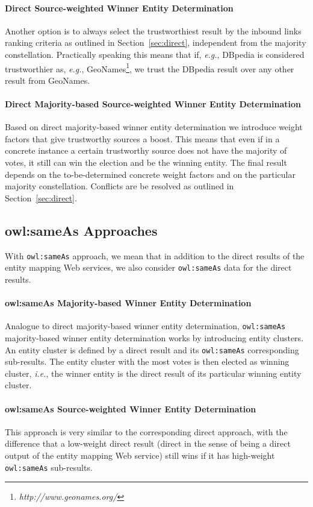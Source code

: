 \documentclass[twocolumn]{article}
\begin{document}
\paragraph{Direct Source-weighted Winner Entity Determination}
Another option is to always select the trustworthiest result by the inbound links ranking criteria as outlined in Section~\ref{sec:direct}, independent from the majority constellation. Practically speaking this means that
if, \emph{e.g.}, DBpedia is considered trustworthier as, \emph{e.g.},  GeoNames\footnote{\textit{http://www.geonames.org/}}, we
trust the DBpedia result over any other result from GeoNames.

\paragraph{Direct Majority-based Source-weighted Winner Entity Determination}
Based on direct majority-based winner entity determination we introduce weight factors that give trustworthy
sources a boost. This means that even if in a concrete instance a certain trustworthy source does not have the majority of votes, it still
can win the election and be the winning entity. The final result depends on the to-be-determined concrete
weight factors and on the particular majority constellation. Conflicts are be resolved as outlined in Section~\ref{sec:direct}.

\subsection{owl:sameAs Approaches}
With \texttt{owl:sameAs} approach, we mean that in addition to the direct results of the entity mapping Web services, we also
consider \texttt{owl:sameAs} data for the direct results.

\paragraph{owl:sameAs Majority-based Winner Entity Determination}\label{sec:owlsameas}
Analogue to direct majority-based winner entity determination, \texttt{owl:sameAs} majority-based winner entity
determination works by introducing entity clusters. An entity cluster is defined by a direct result and its
\texttt{owl:sameAs} corresponding sub-results. The entity cluster with the most votes is then elected as winning
cluster, \emph{i.e.}, the winner entity is the direct result of its particular winning entity cluster.

\paragraph{owl:sameAs Source-weighted Winner Entity Determination}
This approach is very similar to the corresponding direct approach, with the difference that a low-weight direct result
(direct in the sense of being a direct output of the entity mapping Web service) still wins if it has high-weight
\texttt{owl:sameAs} sub-results.
\end{document}
